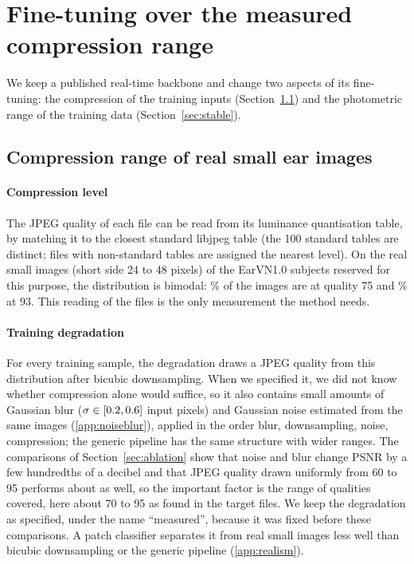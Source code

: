 \section{Fine-tuning over the measured compression range}
\label{sec:method}
We keep a published real-time backbone and change two aspects of its fine-tuning: the compression of the training inputs (Section~\ref{sec:measured}) and the photometric range of the training data (Section~\ref{sec:stable}).

\subsection{Compression range of real small ear images}
\label{sec:measured}
\paragraph{Compression level} The JPEG quality of each file can be read from its luminance quantisation table, by matching it to the closest standard libjpeg table (the 100 standard tables are distinct; files with non-standard tables are assigned the nearest level). On the \FitSmall{} real small images (short side 24 to 48 pixels) of the \RoleFit{} EarVN1.0 subjects reserved for this purpose, the distribution is bimodal: \QLowShare{}\% of the images are at quality 75 and \QHighShare{}\% at 93. This reading of the files is the only measurement the method needs.

\paragraph{Training degradation} For every training sample, the degradation draws a JPEG quality from this distribution after bicubic downsampling. When we specified it, we did not know whether compression alone would suffice, so it also contains small amounts of Gaussian blur ($\sigma\in[0.2,0.6]$ input pixels) and Gaussian noise estimated from the same images (\ref{app:noiseblur}), applied in the order blur, downsampling, noise, compression; the generic pipeline has the same structure with wider ranges. The comparisons of Section~\ref{sec:ablation} show that noise and blur change PSNR by a few hundredths of a decibel and that JPEG quality drawn uniformly from 60 to 95 performs about as well, so the important factor is the range of qualities covered, here about 70 to 95 as found in the target files. We keep the degradation as specified, under the name ``measured'', because it was fixed before these comparisons. A patch classifier separates it from real small images less well than bicubic downsampling or the generic pipeline (\ref{app:realism}).

